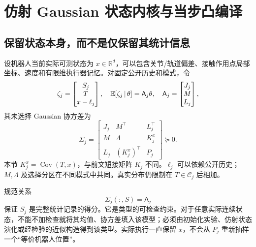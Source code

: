 \documentclass[UTF8,fontset=fandol,zihao=5,a4paper]{ctexart}
\newcommand{\R}{\mathbb R}\newcommand{\N}{\mathcal N}
\newcommand{\E}{\mathbb E}\newcommand{\Pp}{\mathbb P}
\DeclareMathOperator{\Cov}{Cov}\DeclareMathOperator{\im}{im}
\theoremstyle{definition}
\theoremstyle{remark}\newtheorem{remark}[theorem]{说明}
\numberwithin{equation}{section}
\begin{document}
\section{仿射 Gaussian 状态内核与当步凸编译}
\label{sec:state}
\subsection{保留状态本身，而不是仅保留其统计信息}
设机器人当前实际可测状态为 $x\in\R^d$，可以包含关节/轨道偏差、接触作用点局部坐标、速度和有限维执行器记忆。对固定公开历史和模式，令
\begin{equation}
\zeta_j=\begin{bmatrix}S_j\\T\\x-\ell_j\end{bmatrix},\quad
\E[\zeta_j\given\theta]=\mathsf A_j\theta,
\quad\mathsf A_j=\begin{bmatrix}J_j\\M\\L_j\end{bmatrix},
\label{eq:statezeta}
\end{equation}
其未选择 Gaussian 协方差为
\begin{equation}
\Sigma_j=
\begin{bmatrix}
J_j&M^\top&L_j^\top\\
M&\Lambda&K_j^x\\
L_j&(K_j^x)^\top&P_j
\end{bmatrix}\succeq0.
\label{eq:statecov}
\end{equation}
本节 $K_j^x=\Cov(T,x)$，与前文短接矩阵 $K_j$ 不同。$\ell_j$ 可以依赖公开历史；$M,\Lambda$ 及选择分区在不同模式中共同。真实分布仍限制在 $T\in\mathcal C_j$ 后相加。

规范关系
\begin{equation}
\Sigma_j(:,S)=\mathsf A_j
\label{eq:scoreidentity}
\end{equation}
保证 $S_j$ 是完整统计记录的得分。它是类型的可检查约束。对于任意实际连续状态，不能不加检查就将其均值、协方差填入该模型；必须由初始化实验、仿射状态演化或经检验的近似构造得到该类型。实际执行一直保留 $x$，不会从 $P_j$ 重新抽样一个“等价机器人位置”。
\end{document}
